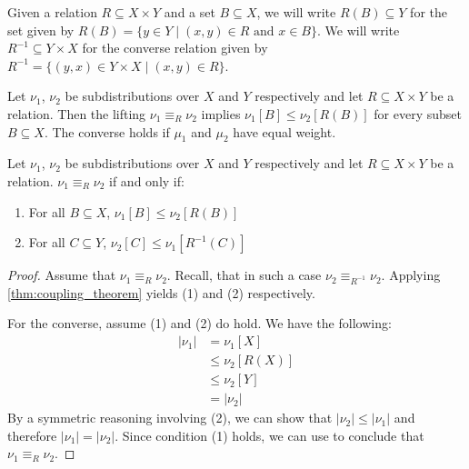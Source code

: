 Given a relation ${R}\subseteq{X \times Y}$ and a set $B \subseteq X$, we will write $R(B) \subseteq Y$ for the set given by $R(B)= \{y \in Y \mid (x,y) \in R \text{ and } x \in B\}$. We will write $R^{-1} \subseteq Y \times X$ for the converse relation given by $R^{-1} = \{(y,x) \in Y \times X \mid (x,y) \in R\}$. 
\begin{theorem}\label{thm:coupling_theorem}
Let $\nu_1$, $\nu_2$ be subdistributions over $X$ and $Y$ respectively and let $R \subseteq X \times Y$ be a relation. Then the lifting $\nu_1 \equiv_R \nu_2$ implies $\nu_1[B] \leq \nu_2[R(B)]$ for every subset $B \subseteq X$. The converse holds if $\mu_1$ and $\mu_2$ have equal weight.
\end{theorem}
\begin{lemma}\label{lem:coupling_lemma}
Let $\nu_1$, $\nu_2$ be subdistributions over $X$ and $Y$ respectively and let $R \subseteq X \times Y$ be a relation. $\nu_1 \equiv_R \nu_2$ if and only if:
\begin{enumerate}
	\item For all $B \subseteq X$,  $\nu_1[B] \leq \nu_2[R(B)]$
	\item For all $C \subseteq Y$, $\nu_2[C] \leq \nu_1[R^{-1}(C)]$
\end{enumerate}
\end{lemma}
\begin{proof}
	Assume that $\nu_1 \equiv_R \nu_2$. Recall, that in such a case $\nu_2 \equiv_{R^{-1}} \nu_2$. Applying \cref{thm:coupling_theorem} yields (1) and (2) respectively.
	
	For the converse, assume (1) and (2) do hold. We have the following:
\begin{align*}
	|\nu_1| &= \nu_1[X] \\
	&\leq \nu_2[R(X)] \tag{1} \\
	&\leq \nu_2[Y] \tag{$R(X) \subseteq Y$}\\
	&= |\nu_2|
\end{align*}
By a symmetric reasoning involving (2), we can show that $|\nu_2| \leq |\nu_1|$ and therefore $|\nu_1| = |\nu_2|$. Since condition (1) holds, we can use  to conclude that $\nu_1 \equiv_R \nu_2$.
\end{proof}
  
